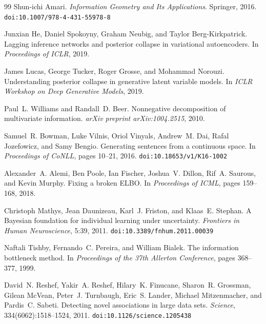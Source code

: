 \documentclass[10pt]{article} %
\theoremstyle{plain}
\theoremstyle{definition}
\begin{document}
\begin{thebibliography}{99}
Shun-ichi Amari.
\newblock \emph{Information Geometry and Its Applications}.
\newblock Springer, 2016.
\newblock \texttt{doi:10.1007/978-4-431-55978-8}

Junxian He, Daniel Spokoyny, Graham Neubig, and Taylor Berg-Kirkpatrick.
\newblock Lagging inference networks and posterior collapse in variational autoencoders.
\newblock In \emph{Proceedings of ICLR}, 2019.

James Lucas, George Tucker, Roger Grosse, and Mohammad Norouzi.
\newblock Understanding posterior collapse in generative latent variable models.
\newblock In \emph{ICLR Workshop on Deep Generative Models}, 2019.

Paul~L. Williams and Randall~D. Beer.
\newblock Nonnegative decomposition of multivariate information.
\newblock \emph{arXiv preprint arXiv:1004.2515}, 2010.

Samuel~R. Bowman, Luke Vilnis, Oriol Vinyals, Andrew~M. Dai, Rafal Jozefowicz, and Samy Bengio.
\newblock Generating sentences from a continuous space.
\newblock In \emph{Proceedings of CoNLL}, pages 10--21, 2016.
\newblock \texttt{doi:10.18653/v1/K16-1002}

Alexander~A. Alemi, Ben Poole, Ian Fischer, Joshua~V. Dillon, Rif~A. Saurous, and Kevin Murphy.
\newblock Fixing a broken {ELBO}.
\newblock In \emph{Proceedings of ICML}, pages 159--168, 2018.

Christoph Mathys, Jean Daunizeau, Karl~J. Friston, and Klaas~E. Stephan.
\newblock A {B}ayesian foundation for individual learning under uncertainty.
\newblock \emph{Frontiers in Human Neuroscience}, 5:39, 2011.
\newblock \texttt{doi:10.3389/fnhum.2011.00039}

Naftali Tishby, Fernando~C. Pereira, and William Bialek.
\newblock The information bottleneck method.
\newblock In \emph{Proceedings of the 37th Allerton Conference}, pages 368--377, 1999.

David~N. Reshef, Yakir~A. Reshef, Hilary~K. Finucane, Sharon~R. Grossman, Gilean McVean, Peter~J. Turnbaugh, Eric~S. Lander, Michael Mitzenmacher, and Pardis~C. Sabeti.
\newblock Detecting novel associations in large data sets.
\newblock \emph{Science}, 334(6062):1518--1524, 2011.
\newblock \texttt{doi:10.1126/science.1205438}


\end{thebibliography}
\end{document}
